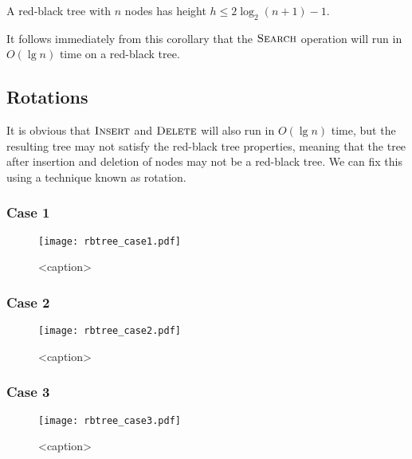 \begin{corollary}
    A red-black tree with $n$ nodes has height $h \leq 2\log_2 (n+1)-1$. 
\end{corollary}

It follows immediately from this corollary that the $\textsc{Search}$ operation will run in $O(\lg n)$ time on a red-black tree.

\subsection{Rotations}

It is obvious that $\textsc{Insert}$ and $\textsc{Delete}$ will also run in $O(\lg n)$ time, but the resulting tree may not satisfy the red-black tree properties, meaning that the tree after insertion and deletion of nodes may not be a red-black tree. We can fix this using a technique known as rotation.

\subsubsection{Case 1}

\begin{figure}[htbp]
    \centering
    \texttt{[image: rbtree\_case1.pdf]}
    \caption{<caption>}
    \label{fig:rbtree_case1}
\end{figure}

\subsubsection{Case 2}

\begin{figure}[htbp]
    \centering
    \texttt{[image: rbtree\_case2.pdf]}
    \caption{<caption>}
    \label{fig:rbtree_case2}
\end{figure}

\subsubsection{Case 3}

\begin{figure}[htbp]
    \centering
    \texttt{[image: rbtree\_case3.pdf]}
    \caption{<caption>}
    \label{fig:rbtree_case3}
\end{figure}